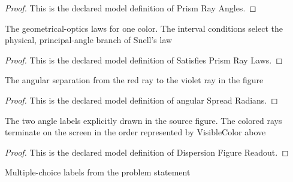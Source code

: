 \begin{proof}
  This is the declared model definition of Prism Ray Angles.
\end{proof}
\begin{definition}
  \label{def:physics:phyx-mini-0008:phyxminiproblems-problem0008-satisfiesprismraylaws}
  The geometrical-optics laws for one color. The interval conditions select the physical, principal-angle branch of Snell's law
\end{definition}
\begin{proof}
  This is the declared model definition of Satisfies Prism Ray Laws.
\end{proof}
\begin{definition}
  \label{def:physics:phyx-mini-0008:phyxminiproblems-problem0008-angularspreadradians}
  The angular separation from the red ray to the violet ray in the figure
\end{definition}
\begin{proof}
  This is the declared model definition of angular Spread Radians.
\end{proof}
\begin{definition}
  \label{def:physics:phyx-mini-0008:phyxminiproblems-problem0008-dispersionfigurereadout}
  The two angle labels explicitly drawn in the source figure. The colored rays terminate on the screen in the order represented by VisibleColor above
\end{definition}
\begin{proof}
  This is the declared model definition of Dispersion Figure Readout.
\end{proof}
\begin{definition}
  \label{def:physics:phyx-mini-0008:phyxminiproblems-problem0008-answerchoice}
  Multiple-choice labels from the problem statement
\end{definition}
